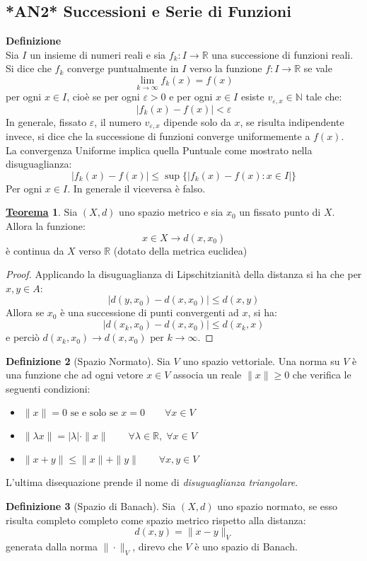 \documentclass[a4paper,twoside]{article}
\renewcommand{\epsilon}{\varepsilon}
\newcommand{\N}{\mathbb{N}}
\newcommand{\R}{\mathbb{R}}
\theoremstyle{definition}
\newtheorem{theorem}{\color{Red}\underline{\textrm Teorema}}
\newtheorem{definizione}[theorem]{Definizione}
\numberwithin{theorem}{section}
\begin{document}
\subsection{*AN2* Successioni e Serie di Funzioni}
\textbf{Definizione}\\
Sia $I$ un insieme di numeri reali e sia $f_k:I\to\R$ una successione di funzioni reali. Si dice che $f_k$ converge puntualmente in $I$ verso la funzione $f:I\to\R$ se vale $$\lim_{k\to\infty} f_k(x)=f(x)$$
per ogni $x\in I$, cioè se per ogni $\epsilon>0$ e per ogni $x\in I$ esiste $v_{\epsilon,x}\in\N$ tale che:
$$|f_k(x)-f(x)|<\epsilon$$ In generale, fissato $\epsilon$, il numero  $v_{\epsilon,x}$ dipende solo da $x$, se risulta indipendente invece, si dice che la successione di funzioni converge uniformemente a $f(x)$.\\
La convergenza Uniforme implica quella Puntuale come mostrato nella disuguaglianza: $$|f_k(x) -f(x)|\leq \sup\{|f_k(x)-f(x): x\in I|\}$$
Per ogni $x\in I$. In generale il viceversa è falso.
\begin{theorem}
Sia $(X,d)$ uno spazio metrico e sia $x_0$ un fissato punto di $X$. Allora la funzione: $$x\in X\to d(x,x_0)$$
è continua da $X$ verso $\R$ (dotato della metrica euclidea)
\end{theorem}
\begin{proof}
    Applicando la disuguaglianza di Lipschitzianità della distanza si ha che per $x,y\in A$:
    $$|d(y,x_0)-d(x,x_0)|\leq d(x,y)$$
    Allora se $x_0$ è una successione di punti convergenti ad $x$, si ha: 
    $$|d(x_k,x_0)-d(x,x_0)|\leq d(x_k,x)$$
    e perciò $d(x_k,x_0)\to d(x,x_0)\text{ per } k\to\infty$.
\end{proof}
\begin{definizione}[Spazio Normato]
Sia $V$ uno spazio vettoriale. Una norma su $V$ è una funzione che ad ogni vetore $x\in V$ associa un reale $\|x\|\geq 0$ che verifica le seguenti condizioni:
\begin{itemize}
    \item $\|x\|=0 \text{ se e solo se } x=0 \qquad \forall x\in V$
    \item $\|\lambda x\|=|\lambda|\cdot\|x\|\qquad \forall\lambda\in\R,\; \forall x\in V$
    \item $\|x+y\|\leq \|x\|+\|y\|\qquad \forall x,y\in V$
\end{itemize}
\end{definizione}
L'ultima disequazione prende il nome di \emph{disuguaglianza triangolare}.
\begin{definizione}[Spazio di Banach]
Sia $(X,d)$ uno spazio normato, se esso risulta completo completo come spazio metrico rispetto alla distanza: $$d(x,y)=\|x-y\|_V$$ generata dalla norma $\|\cdot\|_V$, direvo che $V$ è uno spazio di Banach.    
\end{definizione}
\end{document}

